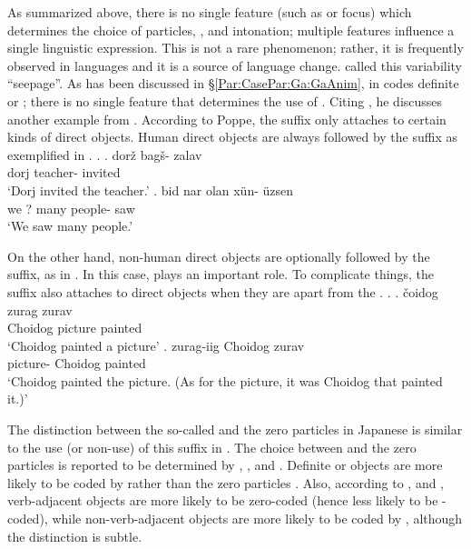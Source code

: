 As summarized above,
there is no single feature (such as  or focus) which determines
the choice of particles, , and intonation;
multiple features influence a single linguistic expression.
This is not a rare phenomenon;
rather, it is frequently observed in languages and
it is a source of language change.
 called this variability ``seepage''.
As has been discussed in \S \ref{Par:CasePar:Ga:GaAnim},
 in  codes definite or  ;
there is no single feature that determines the use of .
Citing \cite{poppe70}, he discusses another example from .
According to Poppe, the  suffix  only attaches to certain kinds of direct objects.
Human direct objects are always followed by the suffix as exemplified in
\Next.
%
\ex.\label{Disc:Ex:Mongolian1}
 \ag. dor\v{z} bag\v{s}- zalav \\
	dorj teacher-{} invited \\
	`Dorj invited the teacher.'
 \bg. bid nar olan x\"{u}n- \"{u}zsen \\
	we ? many people-{} saw \\
	`We saw many people.'
	\hfill{\cite[18]{comrie79}}

On the other hand, non-human direct objects are optionally followed by the suffix, as in \Next.
In this case,
 plays an important role.
To complicate things,
the suffix also attaches to  direct objects
when they are apart from the .
%
\ex.\label{Disc:Ex:Mongolian2}
 \ag. \v{c}oidog zurag zurav \\
	Choidog picture painted \\
	`Choidog painted a picture'
 \bg. zurag-iig Choidog zurav \\
	picture- Choidog painted \\
	`Choidog painted the picture. (As for the picture, it was Choidog that painted it.)'
	\hfill{\cite[19]{comrie79}}

The distinction between the so-called   and the zero particles in Japanese is similar to the use (or non-use) of this suffix  in .
The choice between  and the zero particles is reported to be determined by , , and .
Definite or  objects are more likely to be coded by 
rather than the zero particles \cite{minashima01,fry01,kurumadajaeger13,kurumadajaeger15}.
Also,
according to , and ,
verb-adjacent objects are more likely to be zero-coded (hence less likely to be -coded),
while non-verb-adjacent objects are more likely to be coded by ,
although the distinction is subtle.


